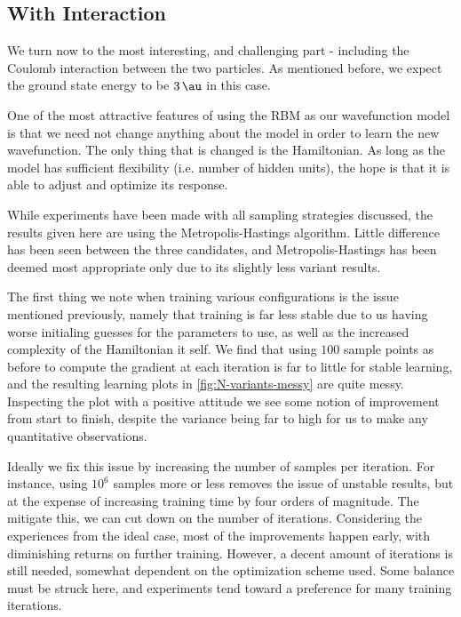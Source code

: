 \documentclass[a4paper, 11pt]{article}
\begin{document}
\begin{multicols}{2}
    \subsection{With Interaction}

    We turn now to the most interesting, and challenging part - including the
    Coulomb interaction between the two particles. As mentioned before, we
    expect the ground state energy to be $\SI{3}{\au}$ in this case. 

    One of the most attractive features of using the RBM as our wavefunction
    model is that we need not change anything about the model in order to learn
    the new wavefunction. The only thing that is changed is the Hamiltonian. As
    long as the model has sufficient flexibility (i.e. number of hidden units),
    the hope is that it is able to adjust and optimize its response.

    While experiments have been made with all sampling strategies discussed, the
    results given here are using the Metropolis-Hastings algorithm. Little 
    difference has been seen between the three candidates, and
    Metropolis-Hastings has been deemed most appropriate only due to its
    slightly less variant results.  

    The first thing we note when training various configurations is the issue
    mentioned previously, namely that training is far less stable due to us
    having worse initialing guesses for the parameters to use, as well as the
    increased complexity of the Hamiltonian it self. We find that using $100$
    sample points as before to compute the gradient at each iteration is far to
    little for stable learning, and the resulting learning plots in
    \autoref{fig:N-variants-messy} are quite messy. Inspecting the plot with a
    positive attitude we see some notion of improvement from start to finish,
    despite the variance being far to high for us to make any quantitative
    observations.

    Ideally we fix this issue by increasing the number of samples per iteration.
    For instance, using $10^6$ samples more or less removes the issue of
    unstable results, but at the expense of increasing training time by four
    orders of magnitude. The mitigate this, we can cut down on the number of
    iterations. Considering the experiences from the ideal case, most of the
    improvements happen early, with diminishing returns on further training.
    However, a decent amount of iterations is still needed, somewhat dependent
    on the optimization scheme used. Some balance must be struck here, and
    experiments tend toward a preference for many training iterations.



\end{multicols}
\end{document}

